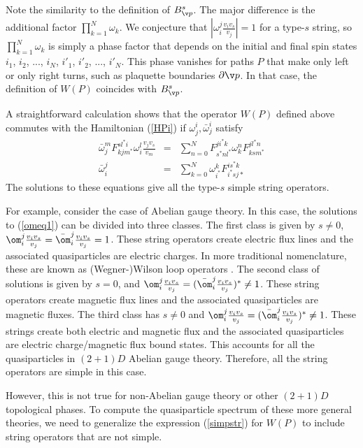 \documentclass[aps,twocolumn,groupedaddress,showpacs,floatfix]{revtex4}
\def\w{v}
\begin{document}
Note the similarity to the definition of $B^s_{\v p}$. The major difference is 
the additional factor $\prod_{k=1}^{N} \omega_k$. We conjecture that 
$|\omega^{j}_{i}\frac{\w_i\w_s}{\w_j}| = 1$ for a type-$s$ string, 
so $\prod_{k=1}^{N} \omega_k$ is simply a phase factor
that depends on the initial and final spin states 
$i_1$, $i_2$, ..., $i_N$, $i'_1$, $i'_2$, ..., $i'_N$. This phase vanishes 
for paths $P$ that make only left or only right turns, such as plaquette 
boundaries $\partial \v p$. In that case, the definition of $W(P)$ coincides 
with $B^s_{\v p}$.

A straightforward calculation shows that the operator $W(P)$ defined above 
commutes with the Hamiltonian (\ref{HPi}) if 
$\omega^{i}_{j}, \bar{\omega}^{i}_{j}$ satisfy
\begin{eqnarray}
\label{omeq1}
\bar{\omega}^{m}_{j}F^{sl^*i}_{kjm^*}\omega^{l}_{i}
\frac{\w_j \w_s}{\w_m} &=&
\sum_{n=0}^{N}F^{ji^*k}_{s^*nl^*}\omega^{n}_{k}F^{jl^*n}_{ksm^*} 
\nonumber \\
\bar{\omega}^{j}_{i} &=& \sum_{k=0}^N \omega^{k}_{i^*}F^{is^*k}_{i^*sj*}
\end{eqnarray}
The solutions to these equations give all the type-$s$ simple string
operators. 

For example, consider the case of Abelian gauge theory. In this case, the
solutions to (\ref{omeq1}) can be divided into three classes. The first class
is given by $s \neq 0$, $\om^{j}_{i}\frac{\w_i\w_s}{\w_j} =
\bar{\om}^{j}_{i}\frac{\w_i\w_s}{\w_j} = 1$. These string operators create
electric flux lines and the associated quasiparticles are electric charges. In
more traditional nomenclature, these are known as (Wegner-)Wilson loop 
operators \cite{W7159,W7445}. The second class of solutions is given by 
$s = 0$, and 
$\om^{j}_{i}\frac{\w_i\w_s}{\w_j} = (\bar{\om}^{j}_{i}\frac{\w_i\w_s}{\w_j})^*
\neq 1$. These string operators create magnetic flux lines and the associated
quasiparticles are magnetic fluxes. The third class has $s \neq 0$ and
$\om^{j}_{i}\frac{\w_i\w_s}{\w_j} = (\bar{\om}^{j}_{i}\frac{\w_i\w_s}{\w_j})^*
\neq 1$.  These strings create both electric and magnetic flux and the
associated quasiparticles are electric charge/magnetic flux bound states. This
accounts for all the quasiparticles in $(2+1)D$ Abelian gauge theory.
Therefore, all the string operators are simple in this case. 

However, this is not true for non-Abelian gauge theory or other $(2+1)D$ 
topological phases. To compute the quasiparticle spectrum of these more 
general theories, we need to generalize the expression (\ref{simpstr}) for 
$W(P)$ to include string operators that are not simple.
\end{document}
